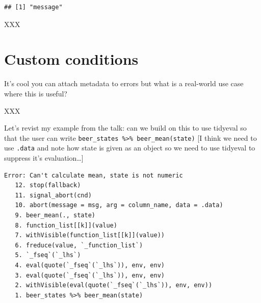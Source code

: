 \documentclass[]{book}
\newenvironment{Shaded}{\begin{snugshade}}{\end{snugshade}}
\newcommand{\ControlFlowTok}[1]{\textcolor[rgb]{0.13,0.29,0.53}{\textbf{#1}}}
\newcommand{\DataTypeTok}[1]{\textcolor[rgb]{0.13,0.29,0.53}{#1}}
\newcommand{\KeywordTok}[1]{\textcolor[rgb]{0.13,0.29,0.53}{\textbf{#1}}}
\newcommand{\NormalTok}[1]{#1}
\newcommand{\OperatorTok}[1]{\textcolor[rgb]{0.81,0.36,0.00}{\textbf{#1}}}
\newcommand{\StringTok}[1]{\textcolor[rgb]{0.31,0.60,0.02}{#1}}
\begin{document}
\begin{verbatim}
## [1] "message"
\end{verbatim}

XXX

\hypertarget{custom-conditions}{%
\section*{Custom conditions}\label{custom-conditions}}

It's cool you can attach metadata to errors but what is a real-world use case where this is useful?

XXX

Let's revist my example from the talk: can we build on this to use tidyeval so that the user can write \texttt{beer\_states\ \%\textgreater{}\%\ beer\_mean(state)} {[}I think we need to use \texttt{.data} and note how state is given as an object so we need to use tidyeval to suppress it's evaluation\ldots{}{]}

\begin{Shaded}
\end{Shaded}

\begin{verbatim}
Error: Can't calculate mean, state is not numeric
   12. stop(fallback)
   11. signal_abort(cnd)
   10. abort(message = msg, arg = column_name, data = .data)
   9. beer_mean(., state)
   8. function_list[[k]](value)
   7. withVisible(function_list[[k]](value))
   6. freduce(value, `_function_list`)
   5. `_fseq`(`_lhs`)
   4. eval(quote(`_fseq`(`_lhs`)), env, env)
   3. eval(quote(`_fseq`(`_lhs`)), env, env)
   2. withVisible(eval(quote(`_fseq`(`_lhs`)), env, env))
   1. beer_states %>% beer_mean(state)
\end{verbatim}


\end{document}
